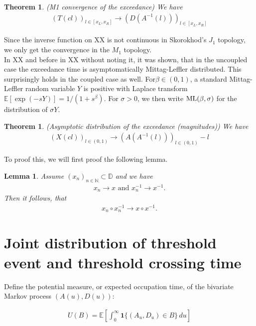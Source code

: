 \documentclass[12pt]{article}
\newtheorem{theorem}[equation]{Theorem}
\newtheorem{lemma}[equation]{Lemma}
\newcommand{\N}{\mathbb{N}}
\newcommand{\E}{\mathbb{E}}
\newcommand{\ex}{\mathbb {E}}
\newcommand{\1}{\mathbf 1}
\newcommand{\D}{\mathbb{D}}
\begin{document}
\begin{theorem}(M1 convergence of the exceedance)
We have 
\begin{align*}
(T(cl))_{l \in [x_L,x_R]}  \rightarrow (D(A^{-1}(l)))_{l \in [x_L,x_R]} 
\end{align*}
\end{theorem}
Since the inverse function on XX is not continuous in Skorokhod's $J_1$ topology, we only get the convergence in the $M_1$ topology.\\
In XX and before in XX without noting it, it was shown, that in the uncoupled case the exceedance time is asymptomatically Mittag-Leffler distributed. This surprisingly holds in the coupled case as well. For$\beta \in (0,1)$, a standard Mittag-Leffler 
random variable $Y$ is positive with Laplace transform
$\E[\exp(-s Y)] = 1/(1+s^\beta)$. For $\sigma > 0$, we then write 
${\rm ML}(\beta, \sigma)$ for the distribution of $\sigma Y$. \\


\begin{theorem}(Asymptotic distribution of the exceedance (magnitudes))
We have 
\begin{align*}
(X(cl))_{l \in (0,1)} \rightarrow (A(A^{-1}(l)))_{l \in (0,1)} - l
\end{align*}
\end{theorem}

To proof this, we will first proof the following lemma.

\begin{lemma} 
Assume $(x_n)_{n \in \N} \subset \D$ and we have
\begin{align*}
x_n \rightarrow x  \text{ and }  x_n^{-1} \rightarrow x^{-1}. 
\end{align*}
Then it follows, that
\begin{align*}
x_n \circ x_n^{-1} \rightarrow x \circ x^{-1}.
\end{align*}
\end{lemma}


\section{Joint distribution of threshold event and threshold crossing time}

Define the potential measure, or expected occupation time, of the bivariate 
Markov process $(A(u),D(u))$:

\begin{align*}
U(B) = \ex \left[ \int_0^\infty \mathbf 1\{ (A_u, D_u) \in B\}\,du \right]
\end{align*}
\end{document}
